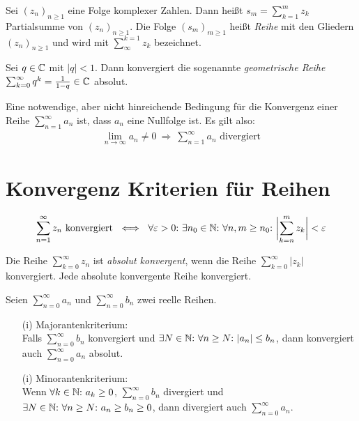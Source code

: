 \begin{frameddefn}[Reihendefinition]
	Sei $(z_n)_{n\geq 1}$ eine Folge komplexer Zahlen. Dann heißt $s_m = \sum_{k=1}^{m} z_k$ Partialsumme von $(z_n)_{n\geq 1}$. Die Folge $(s_m)_{m\geq 1}$ heißt \textit{Reihe} mit den Gliedern $(z_n)_{n\geq 1}$ und wird mit $\sum_{\infty}^{k=1} z_k$ bezeichnet.
\end{frameddefn}

\begin{framedthm}
	Sei $q \in \mathbb{C}$ mit $|q| < 1$. Dann konvergiert die sogenannte \textit{geometrische Reihe} $\sum_{k=0}^{\infty} q^k = \frac{1}{1-q} \in \mathbb{C}$ absolut.
\end{framedthm}

\begin{framedthm}
	Eine notwendige, aber nicht hinreichende Bedingung für die Konvergenz einer Reihe $\sum_{n=1}^{\infty} a_n$ ist, dass $a_n$ eine Nullfolge ist. Es gilt also:
	\begin{align*}
		\lim_{n \to \infty} a_n \neq 0 \ \Rightarrow\ \sum_{n=1}^{\infty} a_n \textrm{ divergiert}
	\end{align*}
\end{framedthm}

\section{Konvergenz Kriterien für Reihen}

\begin{framedthm}
	\begin{align*}
		\sum_{n=1}^{\infty} z_n \textrm{ konvergiert} \ \iff\  \forall \varepsilon > 0{:}\ \exists n_0 \in \mathbb{N}{:}\  \forall n,m \geq n_0{:}\  \biggl|\sum_{k=n}^{m} z_k \biggr| < \varepsilon
	\end{align*}
\end{framedthm}

\begin{frameddefn}
	Die Reihe $\sum_{k=0}^{\infty} z_n$ ist \textit{absolut konvergent}, wenn die Reihe $\sum_{k=0}^{\infty} |z_k|$ konvergiert. Jede absolute konvergente Reihe konvergiert.
\end{frameddefn}

\begin{framedthm} \label{majok}
	Seien $\sum_{n=0}^{\infty} a_n$ und $\sum_{n=0}^{\infty} b_n$ zwei reelle Reihen.
	\begin{enumerate}
		\item[(i)] Majorantenkriterium:\\ Falls $\sum_{n=0}^{\infty} b_n$ konvergiert und $\exists N \in \mathbb{N}{:}\ \forall n \geq N{:}\  |a_n| \leq b_n$, dann konvergiert auch $\sum_{n=0}^{\infty} a_n$ absolut.
		\item[(i)] Minorantenkriterium:\\ Wenn $\forall k \in \mathbb{N}{:}\  a_k \geq 0$, $\sum_{n=0}^{\infty} b_n$ divergiert und $\exists N \in \mathbb{N}{:}\ \forall n \geq N{:}\  a_n \geq b_n \geq 0$, dann divergiert auch $\sum_{n=0}^{\infty} a_n$.
	\end{enumerate}
\end{framedthm}

